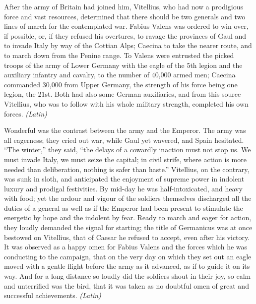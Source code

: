 After the army of Britain had joined him, Vitellius, who had now a prodigious force and vast resources, determined that there should be two generals and two lines of march for the contemplated war. Fabius Valens was ordered to win over, if possible, or, if they refused his overtures, to ravage the provinces of Gaul and to invade Italy by way of the Cottian Alps; Caecina to take the nearer route, and to march down from the Penine range. To Valens were entrusted the picked troops of the army of Lower Germany with the eagle of the 5th legion and the auxiliary infantry and cavalry, to the number of 40,000 armed men; Caecina commanded 30,000 from Upper Germany, the strength of his force being one legion, the 21st. Both had also some German auxiliaries, and from this source Vitellius, who was to follow with his whole military strength, completed his own forces. \emph{(Latin)}


Wonderful was the contrast between the army and the Emperor. The army was all eagerness; they cried out war, while Gaul yet wavered, and Spain hesitated. ``The winter,'' they said, ``the delays of a cowardly inaction must not stop us. We must invade Italy, we must seize the capital; in civil strife, where action is more needed than deliberation, nothing is safer than haste.'' Vitellius, on the contrary, was sunk in sloth, and anticipated the enjoyment of supreme power in indolent luxury and prodigal festivities. By mid-day he was half-intoxicated, and heavy with food; yet the ardour and vigour of the soldiers themselves discharged all the duties of a general as well as if the Emperor had been present to stimulate the energetic by hope and the indolent by fear. Ready to march and eager for action, they loudly demanded the signal for starting; the title of Germanicus was at once bestowed on Vitellius, that of Caesar he refused to accept, even after his victory. It was observed as a happy omen for Fabius Valens and the forces which he was conducting to the campaign, that on the very day on which they set out an eagle moved with a gentle flight before the army as it advanced, as if to guide it on its way. And for a long distance so loudly did the soldiers shout in their joy, so calm and unterrified was the bird, that it was taken as no doubtful omen of great and successful achievements. \emph{(Latin)}


